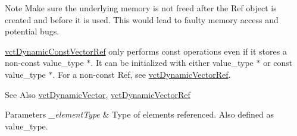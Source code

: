 \begin{DoxyNote}{Note}
Make sure the underlying memory is not freed after the Ref object is created and before it is used. This would lead to faulty memory access and potential bugs.

\hyperlink{classvct_dynamic_const_vector_ref}{vct\-Dynamic\-Const\-Vector\-Ref} only performs const operations even if it stores a non-\/const {\ttfamily value\-\_\-type $\ast$}. It can be initialized with either {\ttfamily value\-\_\-type $\ast$} or {\ttfamily const value\-\_\-type $\ast$}. For a non-\/const Ref, see \hyperlink{classvct_dynamic_vector_ref}{vct\-Dynamic\-Vector\-Ref}.
\end{DoxyNote}
\begin{DoxySeeAlso}{See Also}
\hyperlink{classvct_dynamic_vector}{vct\-Dynamic\-Vector}, \hyperlink{classvct_dynamic_vector_ref}{vct\-Dynamic\-Vector\-Ref}
\end{DoxySeeAlso}

\begin{DoxyParams}{Parameters}
{\em \-\_\-element\-Type} & Type of elements referenced. Also defined as {\ttfamily value\-\_\-type}. \\
\hline
\end{DoxyParams}


